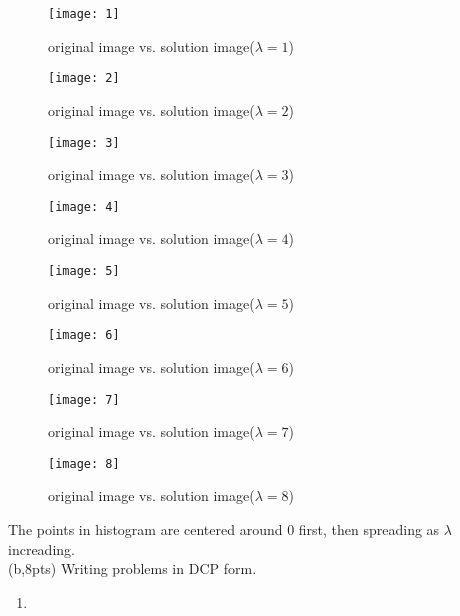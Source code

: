 \documentclass{article}     %
\begin{document}
\begin{figure}[H]
  \centering
\texttt{[image: 1]}
  \caption[]
   { original image vs. solution image($\lambda=1$)}
\end{figure}
\begin{figure}[H]
  \centering
\texttt{[image: 2]}
  \caption[]
   { original image vs. solution image($\lambda=2$)}
\end{figure}
\begin{figure}[H]
  \centering
\texttt{[image: 3]}
  \caption[]
   { original image vs. solution image($\lambda=3$)}
\end{figure}
\begin{figure}[H]
  \centering
\texttt{[image: 4]}
  \caption[]
   { original image vs. solution image($\lambda=4$)}
\end{figure}
\begin{figure}[hb]
  \centering
\texttt{[image: 5]}
  \caption[]
   { original image vs. solution image($\lambda=5$)}
\end{figure}
\begin{figure}[H]
  \centering
\texttt{[image: 6]}
  \caption[]
   { original image vs. solution image($\lambda=6$)}
\end{figure}
\begin{figure}[H]
  \centering
\texttt{[image: 7]}
  \caption[]
   { original image vs. solution image($\lambda=7$)}
\end{figure}

\begin{figure}[H]
  \centering
\texttt{[image: 8]}
  \caption[]
   { original image vs. solution image($\lambda=8$)}
\end{figure}


The points in histogram are centered around 0 first, then spreading as  $\lambda$ increading.
\\

(b,8pts) Writing problems in DCP form.
\begin{enumerate}
    \item 
\end{enumerate}
\end{document}
